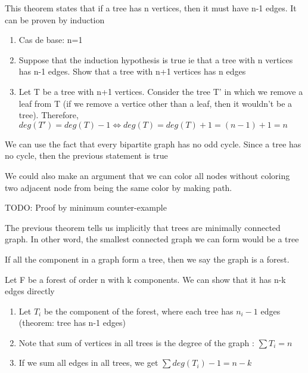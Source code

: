 \documentclass{article}
\begin{document}
\begin{theorem}
    This theorem states that if a tree has n vertices, then it must have
    n-1 edges. It can be proven by induction
    \begin{enumerate}
        \item Cas de base: n=1
	\item Suppose that the induction hypothesis is true ie that a tree
	    with n vertices has n-1 edges. Show that a tree with n+1
	    vertices has n edges
	\item Let T be a tree with n+1 vertices. Consider the tree T' in
	    which we remove a leaf from T (if we remove a vertice other than
	    a leaf, then it wouldn't be a tree). Therefore,
	    $ deg(T')=deg(T)-1 \Longleftrightarrow deg(T) = deg(T)+1 =
	    (n-1)+1=n$
    \end{enumerate}
\end{theorem}

\begin{theorem}
    We can use the fact that every bipartite graph has no odd cycle. Since
    a tree has no cycle, then the previous statement is true
\end{theorem}

\begin{remark}
    We could also make an argument that we can color all nodes without
    coloring two adjacent node from being the same color by making path.
\end{remark}

\begin{theorem}
    TODO: Proof by minimum counter-example
\end{theorem}

\begin{remark}
    The previous theorem tells us implicitly that trees are minimally
    connected graph. In other word, the smallest connected graph we
    can form would be a tree
\end{remark}

\begin{definition}[Forest]
    If all the component in a graph form a tree, then we say the graph is
    a forest.
\end{definition}

\begin{theorem}
    Let F be a forest of order n with k components. We can show that it
    has n-k edges directly
    \begin{enumerate}
        \item Let $T_i$ be the component of the forest, where each tree
	    has $n_i - 1$ edges (theorem: tree has n-1 edges)
	\item Note that sum of vertices in all trees is the degree of the
	    graph : $\sum T_i = n$
	\item If we sum all edges in all trees, we get $ \sum deg(T_i)-1
	    = n - k$
    \end{enumerate}
\end{theorem}
\end{document}
